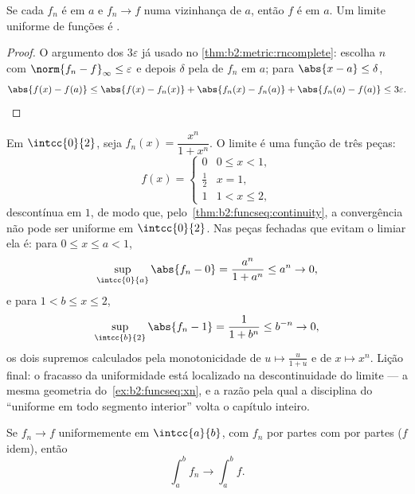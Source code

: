 \begin{theorem}[Continuidade]\label{thm:b2:funcseq:continuity}
Se cada $f_n$ é  em $a$ e $f_n \to f$  numa
vizinhança de $a$, então $f$ é  em $a$. Um limite uniforme
de funções  é .
\end{theorem}

\begin{proof}
O argumento dos $3\varepsilon$ já usado no
\cref{thm:b2:metric:rncomplete}: escolha $n$ com $\norm{f_n -
f}_\infty \leq \varepsilon$ e depois $\delta$ pela  de
$f_n$ em $a$; para $\abs{x - a} \leq \delta$,
\[
\abs{f(x) - f(a)} \leq \abs{f(x) - f_n(x)} + \abs{f_n(x) - f_n(a)}
+ \abs{f_n(a) - f(a)} \leq 3\varepsilon . \qedhere
\]
\end{proof}

\begin{example}\label{ex:b2:funcseq:threshold}
Em $\intcc{0}{2}$, seja $f_n(x) = \dfrac{x^n}{1 + x^n}$. O
limite  é uma função de três peças:
\[
f(x) = \begin{cases} 0 & 0 \leq x < 1,\\[2pt]
\tfrac12 & x = 1,\\[2pt]
1 & 1 < x \leq 2, \end{cases}
\]
descontínua em $1$, de modo que, pelo~\cref{thm:b2:funcseq:continuity},
a convergência não pode ser uniforme em $\intcc{0}{2}$. Nas
peças fechadas que evitam o limiar ela é: para $0 \leq x \leq
a < 1$,
\[
\sup_{\intcc{0}{a}}\abs{f_n - 0}
= \frac{a^n}{1 + a^n} \leq a^n \to 0 ,
\]
e para $1 < b \leq x \leq 2$,
\[
\sup_{\intcc{b}{2}}\abs{f_n - 1}
= \frac{1}{1 + b^n} \leq b^{-n} \to 0 ,
\]
os dois supremos calculados pela monotonicidade de $u \mapsto
\frac{u}{1+u}$ e de $x \mapsto x^n$. Lição final: o
fracasso da uniformidade está localizado na descontinuidade do
limite --- a mesma geometria do~\cref{ex:b2:funcseq:xn}, e a
razão pela qual a disciplina do ``uniforme em todo segmento interior''
volta o capítulo inteiro.
\end{example}

\begin{theorem}\label{thm:b2:funcseq:integration}
Se $f_n \to f$ uniformemente em $\intcc{a}{b}$, com $f_n$  por
partes com  por partes ($f$ idem), então
\[
\int_a^b f_n \longrightarrow \int_a^b f .
\]
\end{theorem}

